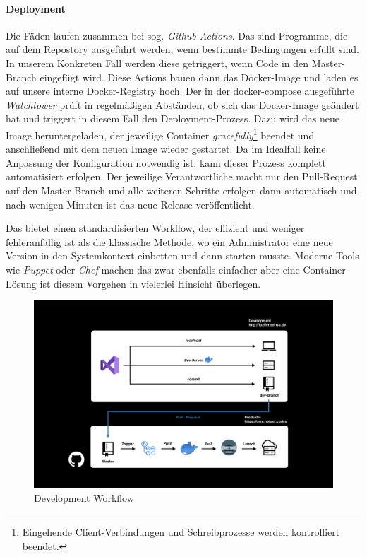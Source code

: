 \documentclass[titlepage, a4paper, 11pt]{scrartcl}
\begin{document}
        \paragraph{Deployment}        

          Die Fäden laufen zusammen bei sog. \textit{Github Actions}. Das sind Programme, die auf dem Repostory ausgeführt werden, wenn bestimmte Bedingungen erfüllt sind.
          In unserem Konkreten Fall werden diese getriggert, wenn Code in den Master-Branch eingefügt wird. Diese Actions bauen dann das Docker-Image und laden es auf unsere interne
          Docker-Registry hoch. Der in der docker-compose ausgeführte \textit{Watchtower} prüft in regelmäßigen Abständen, ob sich das Docker-Image geändert hat und triggert in diesem Fall
          den Deployment-Prozess. Dazu wird das neue Image heruntergeladen, der jeweilige Container \textit{gracefully}\footnote{Eingehende Client-Verbindungen und Schreibprozesse werden kontrolliert beendet.} 
          beendet und anschließend mit dem neuen Image wieder gestartet. Da im Idealfall keine Anpassung der Konfiguration notwendig ist, kann dieser Prozess komplett automatisiert erfolgen.
          Der jeweilige Verantwortliche macht nur den Pull-Request auf den Master Branch und alle weiteren Schritte erfolgen dann automatisch und nach wenigen Minuten ist das neue Release veröffentlicht.

          Das bietet einen standardisierten Workflow, der effizient und weniger fehleranfällig ist als die klassische Methode, wo ein Administrator eine neue Version in den Systemkontext einbetten und
          dann starten musste. Moderne Tools wie \textit{Puppet} oder \textit{Chef} machen das zwar ebenfalls einfacher aber eine Container-Lösung ist diesem Vorgehen in vielerlei Hinsicht überlegen.

          \begin{figure}[h]
            \centering
            \includegraphics[width=.6\textwidth]{pipeline.png}
            \caption{Development Workflow}
            \label{pipeline}
          \end{figure}
\end{document}
